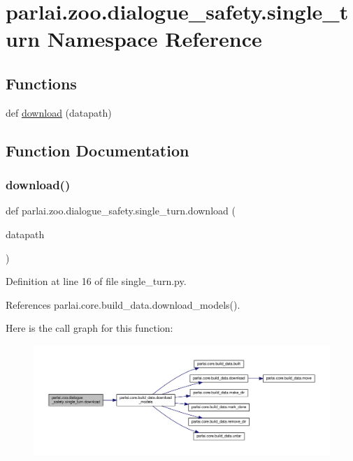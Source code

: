 \hypertarget{namespaceparlai_1_1zoo_1_1dialogue__safety_1_1single__turn}{}\section{parlai.\+zoo.\+dialogue\+\_\+safety.\+single\+\_\+turn Namespace Reference}
\label{namespaceparlai_1_1zoo_1_1dialogue__safety_1_1single__turn}
\subsection*{Functions}
\begin{DoxyCompactItemize}
\item 
def \hyperlink{namespaceparlai_1_1zoo_1_1dialogue__safety_1_1single__turn_a16b618bff8b38c10b5ffc4b822b227dc}{download} (datapath)
\end{DoxyCompactItemize}


\subsection{Function Documentation}
\mbox{\label{namespaceparlai_1_1zoo_1_1dialogue__safety_1_1single__turn_a16b618bff8b38c10b5ffc4b822b227dc}} 
\subsubsection{\texorpdfstring{download()}{download()}}
{\footnotesize\ttfamily def parlai.\+zoo.\+dialogue\+\_\+safety.\+single\+\_\+turn.\+download (\begin{DoxyParamCaption}\item[{}]{datapath }\end{DoxyParamCaption})}



Definition at line 16 of file single\+\_\+turn.\+py.



References parlai.\+core.\+build\+\_\+data.\+download\+\_\+models().

Here is the call graph for this function\+:
\nopagebreak
\begin{figure}[H]
\begin{center}
\leavevmode
\includegraphics[width=350pt]{namespaceparlai_1_1zoo_1_1dialogue__safety_1_1single__turn_a16b618bff8b38c10b5ffc4b822b227dc_cgraph}
\end{center}
\end{figure}

